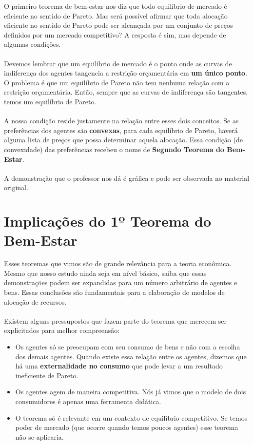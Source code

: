 \documentclass[a4paper,11pt,oneside]{book}
\theoremstyle{definition}
\theoremstyle{break}
\begin{document}
O primeiro teorema de bem-estar nos diz que todo equilíbrio de mercado é eficiente no sentido de Pareto. Mas será possível afirmar que toda alocação eficiente no sentido de Pareto pode ser alcançada por um conjunto de preços definidos por um mercado competitivo? A resposta é sim, mas depende de algumas condições.
\\~\\
Devemos lembrar que um equilíbrio de mercado é o ponto onde as curvas de indiferença dos agentes tangencia a restrição orçamentária em \textbf{um único ponto}. O problema é que um equilíbrio de Pareto não tem nenhuma relação com a restrição orçamentária. Então, sempre que as curvas de indiferença são tangentes, temos um equilíbrio de Pareto.
\\~\\
A nossa condição reside justamente na relação entre esses dois conceitos. Se as preferências dos agentes são \textbf{convexas}, para cada equilíbrio de Pareto, haverá alguma lista de preços que possa determinar aquela alocação. Essa condição (de convexidade) das preferências recebeu o nome de \textbf{Segundo Teorema do Bem-Estar}.
\\~\\
A demonstração que o professor nos dá é gráfica e pode ser observada no material original.

\section{Implicações do 1º Teorema do Bem-Estar}

Esses teoremas que vimos são de grande relevância para a teoria econômica. Mesmo que nosso estudo ainda seja em nível básico, saiba que essas demonstrações podem ser expandidas para um número arbitrário de agentes e bens. Essas conclusões são fundamentais para a elaboração de modelos de alocação de recursos.
\\~\\
Existem alguns pressupostos que fazem parte do teorema que merecem ser explicitados para melhor compreensão:

\begin{itemize}
\item Os agentes só se preocupam com seu consumo de bens e não com a escolha dos demais agentes. Quando existe essa relação entre os agentes, dizemos que há uma \textbf{externalidade no consumo} que pode levar a um resultado ineficiente de Pareto.

\item Os agentes agem de maneira competitiva. Nós já vimos que o modelo de dois consumidores é apenas uma ferramenta didática.

\item O teorema só é relevante em um contexto de equilíbrio competitivo. Se temos poder de mercado (que ocorre quando temos poucos agentes) esse teorema não se aplicaria.
\end{itemize}
\end{document}
